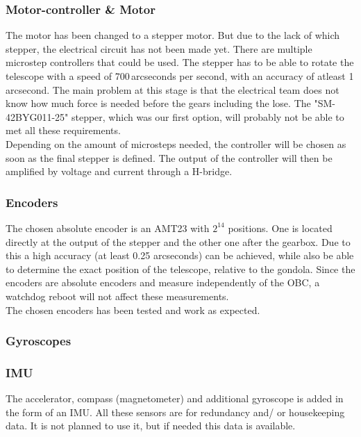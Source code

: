 \subsubsection{Motor-controller \& Motor}
{The motor has been changed to a stepper motor. But due to the lack of which stepper, the electrical circuit has not been made yet. There are multiple microstep controllers that could be used. The stepper has to be able to rotate the telescope with a speed of 700\,arcseconds per second, with an accuracy of atleast 1 arcsecond. The main problem at this stage is that the electrical team does not know how much force is needed before the gears including the lose. The "SM-42BYG011-25" stepper, which was our first option, will probably not be able to met all these requirements.\\

Depending on the amount of microsteps needed, the controller will be chosen as soon as the final stepper is defined. The output of the controller will then be amplified by voltage and current through a H-bridge.

\subsubsection{Encoders}
The chosen absolute encoder is an AMT23 with $2^{14}$ positions. One is located directly at the output of the stepper and the other one after the gearbox. Due to this a high accuracy (at least 0.25 arcseconds) can be achieved, while also be able to determine the exact position of the telescope, relative to the gondola. Since the encoders are absolute encoders and measure independently of the OBC, a watchdog reboot will not affect these measurements.\\

The chosen encoders has been tested and work as expected.


\subsubsection{Gyroscopes}


\hl{}

\subsubsection{IMU}
The accelerator, compass (magnetometer) and additional gyroscope is added in the form of an IMU. All these sensors are for redundancy and/ or housekeeping data. It is not planned to use it, but if needed this data is available.

}

